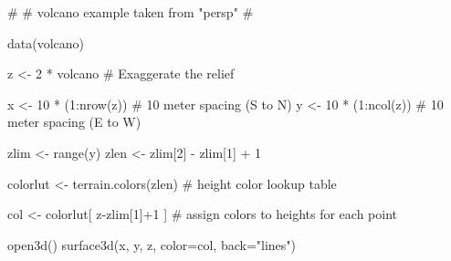 \begin{Examples}
\begin{ExampleCode}

#
# volcano example taken from "persp"
#

data(volcano)

z <- 2 * volcano        # Exaggerate the relief

x <- 10 * (1:nrow(z))   # 10 meter spacing (S to N)
y <- 10 * (1:ncol(z))   # 10 meter spacing (E to W)

zlim <- range(y)
zlen <- zlim[2] - zlim[1] + 1

colorlut <- terrain.colors(zlen) # height color lookup table

col <- colorlut[ z-zlim[1]+1 ] # assign colors to heights for each point

open3d()
surface3d(x, y, z, color=col, back="lines")

\end{ExampleCode}
\end{Examples}

